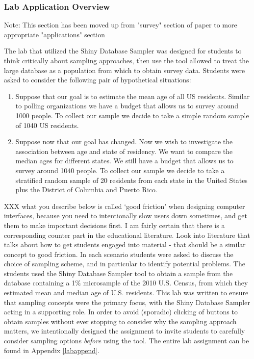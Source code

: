 \documentclass{article}\usepackage[]{graphicx}\usepackage[]{color}
\newcommand{\hh}[1]{{\color{ForestGreen} #1}}
\newcommand{\km}[1]{{\color{Orange} #1}}
\begin{document}
 \subsubsection{Lab Application Overview} 
 \label{LabOverview}
 
\km{ Note: This section has been moved up from "survey" section of paper to more appropriate "applications" section \\ }

The lab that utilized the Shiny Database Sampler was designed for students to think critically about sampling approaches, then use the tool allowed to treat the large database as 
a population from which to obtain survey data. Students were asked to consider the following pair of hypothetical situations:

\begin{enumerate}
\item Suppose that our goal is to estimate the mean age of all US residents. Similar to polling organizations we have a budget that allows us to survey around 1000 people. To collect our sample we decide to take a simple random sample of 1040 US residents.

\item Suppose now that our goal has changed.  Now we wish to investigate the association between age and state of residency. We want to compare the median ages for different states. We still have a budget that allows us to survey around 1040 people. To collect our sample we decide to take a stratified random sample of 20 residents from each state in the United States plus the District of Columbia and Puerto Rico. 
\end{enumerate}

\hh{XXX what you describe below is called `good friction' when designing computer interfaces, because you need to intentionally slow users down sometimes, and get them to make important decisions first. I am fairly certain that there is a corresponding counter part in the educational literature. Look into literature that talks about how to get students engaged into material - that should be a similar concept to good friction.
}
In each scenario students were asked to discuss the choice of sampling scheme, and in particular to identify potential problems. The students used the Shiny Database Sampler tool to obtain a sample from the database containing a 1\% microsample of the 2010 U.S. Census, from which they estimated mean and median age of U.S. residents. This lab was written to ensure that sampling concepts were the primary focus, with the Shiny Database Sampler acting in a supporting role. In order to avoid (sporadic) clicking of buttons to obtain samples without ever stopping to consider why the sampling approach matters, we intentionally designed the assignment to invite students to carefully consider sampling options {\it before} using the tool. The entire lab assignment can be found in Appendix \ref{labappend}. 
\end{document}
